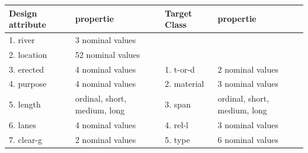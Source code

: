 \documentclass[11pt]{article}
\begin{document}
\begin{center}
  \begin{tabular}{ | l | l | l | l |}
    \hline
    Design attribute & propertie 				  & Target Class   & propertie \\ \hline
    1. river 		 & 3 nominal values 		  &   		   	   & 			\\ \hline
    2. location 	 & 52 nominal values 		  &   		   	   & 			\\ \hline
    3. erected 		 & 4 nominal values 		  & 1. t-or-d 		  	   & 2 nominal values			\\ \hline
    4. purpose 		 & 4 nominal values 		  & 2. material 		   & 3 nominal values			\\ \hline
    5. length 		 & ordinal, short, medium, long & 3. span 		   	   & ordinal, short, medium, long 			\\ \hline
    6. lanes		 & 4 nominal values	  			& 4. rel-l 		       & 3 nominal values 			\\ \hline
    7. clear-g 		 & 2 nominal values		  		& 5. type 		       & 6 nominal values 			\\ \hline
    \hline
  \end{tabular}
  \label{bridgetab_tab0}
\end{center}
\end{document}
